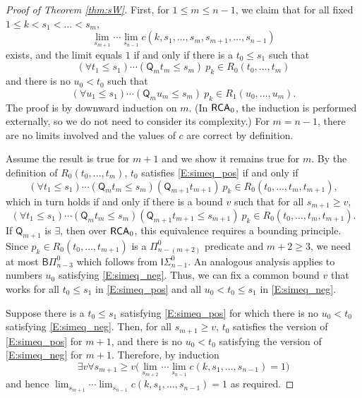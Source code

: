 \documentclass{amsart}
\theoremstyle{definition}
\theoremstyle{remark}
\newcommand{\system}[1]{\mbox{\fontfamily{cmss}\fontshape{n}\fontseries{m}%
    \selectfont#1}}
\newcommand{\RCA}{\system{RCA}\ensuremath{_0}}
\begin{document}
\begin{proof}[Proof of Theorem \ref{thm:sW}]
First, for $1 \leq m \leq n-1$, we claim that for all fixed $1 \leq k < s_1 < \ldots < s_m$,
	\[
		\lim_{s_{m+1}} \cdots \lim_{s_{n-1}} c(k,s_1,\ldots,s_m,s_{m+1},\ldots,s_{n-1})
	\]
exists, and the limit equals $1$ if and only if there is a $t_0 \leq s_1$ such that 
	\begin{equation}\label{E:simeq_pos}
		(\forall t_1 \leq s_1) \cdots (\mathsf{Q}_m t_m \leq s_m)~p_k \in R_0(t_0,\ldots,t_m)
	\end{equation}
and there is no $u_0 < t_0$ such that 
	\begin{equation}\label{E:simeq_neg}
		(\forall u_1 \leq s_1) \cdots (\mathsf{Q}_m u_m \leq s_m)~p_k \in R_1(u_0,\ldots,u_m).
	\end{equation}
The proof is by downward induction on $m$. (In $\RCA$, the induction is performed externally, so we do not need to consider its complexity.) 
For $m = n-1$, there are no limits involved and the values of $c$ are correct by definition. 

Assume the result is true for $m+1$ and we show it remains true for $m$. By the definition of $R_0(t_0, \ldots, t_m)$, $t_0$ satisfies \eqref{E:simeq_pos} if and only if 
	\[
	(\forall t_1 \leq s_1) \cdots (\mathsf{Q}_m t_m \leq s_m)(\mathsf{Q}_{m+1} t_{m+1})~p_k \in R_0(t_0,\ldots,t_m,t_{m+1}),
	\]
	which in turn holds if and only if there is a bound $v$ such that for all $s_{m+1} \geq v$,
	\[
	(\forall t_1 \leq s_1) \cdots (\mathsf{Q}_m t_m \leq s_m)(\mathsf{Q}_{m+1} t_{m+1} \leq s_{m+1})~p_k \in R_0(t_0,\ldots,t_m,t_{m+1}).
	\]
If $\mathsf{Q}_{m+1}$ is $\exists$, then over $\RCA$, this equivalence requires a bounding principle. Since $p_k \in R_0(t_0, \ldots, t_{m+1})$ 
is a $\Pi^0_{n-(m+2)}$ predicate and $m+2 \geq 3$, we need at most $\mathsf{B}\Pi^0_{n-3}$ which follows from $\mathsf{I}\Sigma^0_{n-1}$. An analogous 
analysis applies to numbers $u_0$ satisfying \eqref{E:simeq_neg}. Thus, we can fix a common bound $v$ that works for all $t_0 \leq s_1$ in \eqref{E:simeq_pos} and 
all $u_0 < t_0 \leq s_1$ in \eqref{E:simeq_neg}.

Suppose there is a $t_0 \leq s_1$ satisfying \eqref{E:simeq_pos} for which there is no $u_0 < t_0$ satisfying \eqref{E:simeq_neg}. Then, for all $s_{m+1} \geq v$, $t_0$ 
satisfies the version of \eqref{E:simeq_pos} for $m+1$, and there is no $u_0 < t_0$ satisfying the version of \eqref{E:simeq_neg} for $m+1$. Therefore, by induction 
\[
\exists v \forall s_{m+1} \geq v \big( \lim_{s_{m+2}} \cdots \lim_{s_{n-1}} c(k,s_1, \ldots, s_{n-1}) = 1 \big)
\]
and hence $\lim_{s_{m+1}} \cdots \lim_{s_{n-1}} c(k,s_1, \ldots, s_{n-1}) = 1$ as required. 


\end{proof}
\end{document}
